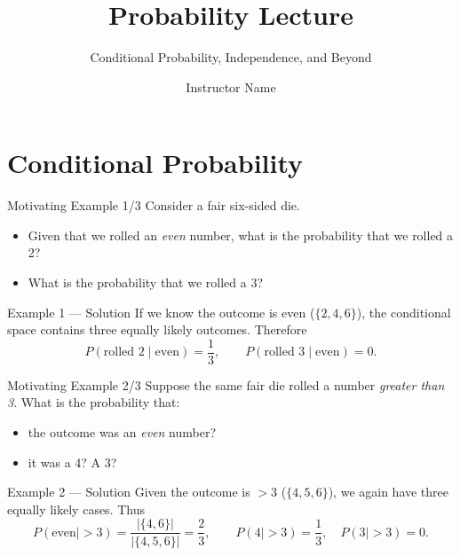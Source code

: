 \documentclass[aspectratio=169,11pt]{beamer} %
\title{Probability Lecture}
\subtitle{Conditional Probability, Independence, and Beyond}
\author{Instructor Name}
\date{}
\begin{document}
\maketitle

\section{Conditional Probability}

\begin{frame}{Motivating Example 1/3}
Consider a fair six-sided die.\\[1ex]
\begin{itemize}
    \item Given that we rolled an \emph{even} number, what is the probability that we rolled a 2?
    \item What is the probability that we rolled a 3?
\end{itemize}
\end{frame}
\begin{frame}{Example 1 — Solution}
If we know the outcome is even ($\{2,4,6\}$), the conditional space contains three equally likely outcomes.  
Therefore  
\[
P(\text{rolled 2}\mid\text{even})=\frac{1}{3},\qquad
P(\text{rolled 3}\mid\text{even})=0.
\]
\end{frame}



\begin{frame}{Motivating Example 2/3}
Suppose the same fair die rolled a number \emph{greater than 3}. What is the probability that:
\begin{itemize}
    \item the outcome was an \emph{even} number?
    \item it was a 4? A 3?
\end{itemize}
\end{frame}
\begin{frame}{Example 2 — Solution}
Given the outcome is $>3$ ($\{4,5,6\}$), we again have three equally likely cases.  
Thus
\[
P(\text{even}\mid>3)=\frac{|\{4,6\}|}{|\{4,5,6\}|}=\frac23,\qquad
P(4\mid>3)=\frac13,\quad P(3\mid>3)=0.
\]
\end{frame}
\end{document}
